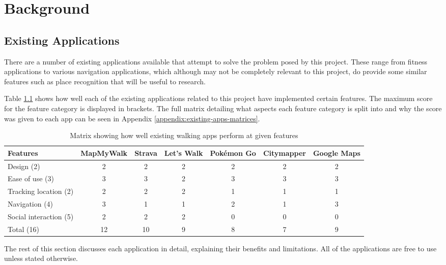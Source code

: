 \chapter{Background}


\section{Existing Applications}


There are a number of existing applications available that attempt to solve the problem posed by this project. These range from fitness applications to various navigation applications, which although may not be completely relevant to this project, do provide some similar features such as place recognition that will be useful to research.

Table \ref{table:existing-walking-apps} shows how well each of the existing applications related to this project have implemented certain features. The maximum score for the feature category is displayed in brackets. The full matrix detailing what aspects each feature category is split into and why the score was given to each app can be seen in Appendix \ref{appendix:existing-apps-matrices}.

\begin{table}[htb]
  \centering
  \begin{tabular}{|m{2cm}||c|c|c|c|c|c|}
    \hline
    Features & MapMyWalk & Strava & Let's Walk & Pok\'{e}mon Go & Citymapper & Google Maps\\
    \hline
    \hline
    Design (2) & 2 & 2 & 2 & 2 & 2 & 2\\
    \hline
    Ease of use (3) & 3 & 3 & 2 & 3 & 3 & 3\\
    \hline
    Tracking location (2) & 2 & 2 & 2 & 1 & 1 & 1\\
    \hline
    Navigation (4) & 3 & 1 & 1 & 2 & 1 & 3\\
    \hline
    Social interaction (5) & 2 & 2 & 2 & 0 & 0 & 0\\
    \hline
    \hline
    Total (16) & 12 & 10 & 9 & 8 & 7 & 9\\
    \hline
  \end{tabular}
  \caption{Matrix showing how well existing walking apps perform at given features}
  \label{table:existing-walking-apps}
\end{table}

The rest of this section discusses each application in detail, explaining their benefits and limitations. All of the applications are free to use unless stated otherwise.

